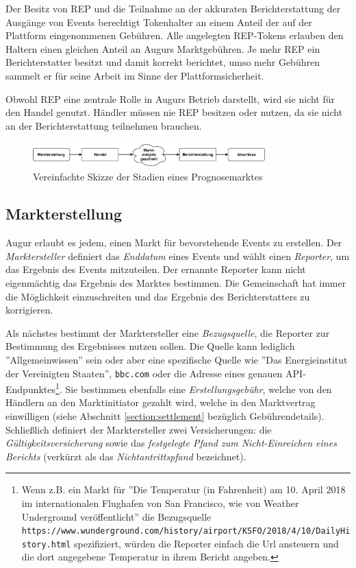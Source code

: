 \documentclass[floatfix,reprint,nofootinbib,amsmath,amssymb,epsfig,pre,floats,letterpaper,groupedaffiliation]{revtex4-1}
\theoremstyle{definition}
\theoremstyle{definition}
\theoremstyle{definition}
\begin{document}
Der Besitz von REP und die Teilnahme an der akkuraten Berichterstattung der Ausgänge von Events berechtigt Tokenhalter an einem Anteil der auf der Plattform eingenommenen Gebühren. Alle angelegten REP-Tokens erlauben den Haltern einen gleichen Anteil an Augurs Marktgebühren. Je mehr REP ein Berichterstatter besitzt und damit korrekt berichtet, umso mehr Gebühren sammelt er für seine Arbeit im Sinne der Plattformsicherheit.

Obwohl REP eine zentrale Rolle in Augurs Betrieb darstellt, wird sie nicht für den Handel genutzt. Händler müssen nie REP besitzen oder nutzen, da sie nicht an der Berichterstattung teilnehmen brauchen.

\begin{figure}
\includegraphics[width=0.8\textwidth]{overview.pdf}
\caption{Vereinfachte Skizze der Stadien eines Prognosemarktes}
\label{fig:overview}
\end{figure}

\subsection{Markterstellung}

Augur erlaubt es jedem, einen Markt für bevorstehende Events zu erstellen. Der \textit{Marktersteller} definiert das \textit{Enddatum} eines Events und wählt einen \textit{Reporter}, um das Ergebnis des Events mitzuteilen. Der ernannte Reporter kann nicht eigenmächtig das Ergebnis des Marktes bestimmen. Die Gemeinschaft hat immer die Möglichkeit einzuschreiten und das Ergebnis des Berichterstatters zu korrigieren.

Als nächstes bestimmt der Marktersteller eine \textit{Bezugsquelle}, die Reporter zur Bestimmung des Ergebnisses nutzen sollen. Die Quelle kann lediglich ''Allgemeinwissen'' sein oder aber eine spezifische Quelle wie ''Das Energieinstitut der Vereinigten Staaten'', \texttt{bbc.com} oder die Adresse eines genauen API-Endpunktes\footnote{Wenn z.B. ein Markt für ''Die Temperatur (in Fahrenheit) am 10. April 2018 im internationalen Flughafen von San Francisco, wie von Weather Underground veröffentlicht'' die Bezugsquelle \texttt{https://www.wunderground.com/history/airport/KSFO/2018/4/10/DailyHistory.html} spezifiziert, würden die Reporter einfach die Url ansteuern und die dort angegebene Temperatur in ihrem Bericht angeben.}. Sie bestimmen ebenfalls eine \textit{Erstellungsgebühr}, welche von den Händlern an den Marktinitiator gezahlt wird, welche in den Marktvertrag einwilligen (siehe Abschnitt \ref{section:settlement} bezüglich Gebührendetails). Schließlich definiert der Marktersteller zwei Versicherungen: die \textit{Gültigkeitsversicherung} sowie das  \textit{festgelegte Pfand zum Nicht-Einreichen eines Berichts} (verkürzt als das \textit{Nichtantrittspfand} bezeichnet).
\end{document}
